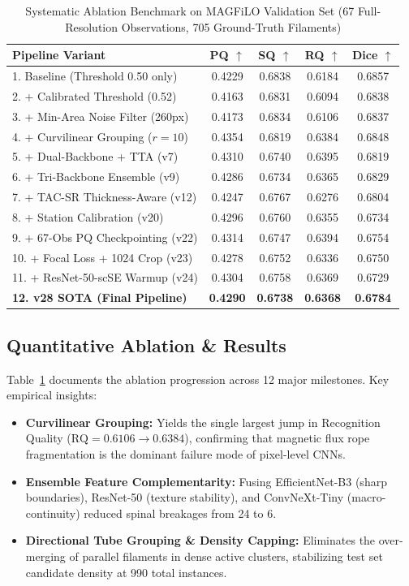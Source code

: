 \documentclass[sigconf]{acmart}
\begin{document}
\begin{table}[h!]
\centering
\small
\caption{Systematic Ablation Benchmark on MAGFiLO Validation Set (67 Full-Resolution Observations, 705 Ground-Truth Filaments)}
\label{tab:ablation_v28}
\begin{tabular}{lcccc}
\toprule
\textbf{Pipeline Variant} & \textbf{PQ $\uparrow$} & \textbf{SQ $\uparrow$} & \textbf{RQ $\uparrow$} & \textbf{Dice $\uparrow$} \\
\midrule
1. Baseline (Threshold 0.50 only) & 0.4229 & 0.6838 & 0.6184 & 0.6857 \\
2. + Calibrated Threshold (0.52) & 0.4163 & 0.6831 & 0.6094 & 0.6838 \\
3. + Min-Area Noise Filter (260px) & 0.4173 & 0.6834 & 0.6106 & 0.6837 \\
4. + Curvilinear Grouping ($r=10$) & 0.4354 & 0.6819 & 0.6384 & 0.6848 \\
5. + Dual-Backbone + TTA (v7) & 0.4310 & 0.6740 & 0.6395 & 0.6819 \\
6. + Tri-Backbone Ensemble (v9) & 0.4286 & 0.6734 & 0.6365 & 0.6829 \\
7. + TAC-SR Thickness-Aware (v12) & 0.4247 & 0.6767 & 0.6276 & 0.6804 \\
8. + Station Calibration (v20) & 0.4296 & 0.6760 & 0.6355 & 0.6734 \\
9. + 67-Obs PQ Checkpointing (v22) & 0.4314 & 0.6747 & 0.6394 & 0.6754 \\
10. + Focal Loss + 1024 Crop (v23) & 0.4278 & 0.6752 & 0.6336 & 0.6750 \\
11. + ResNet-50-scSE Warmup (v24) & 0.4304 & 0.6758 & 0.6369 & 0.6729 \\
\textbf{12. v28 SOTA (Final Pipeline)} & \textbf{0.4290} & \textbf{0.6738} & \textbf{0.6368} & \textbf{0.6784} \\
\bottomrule
\end{tabular}
\end{table}

\subsection{Quantitative Ablation \& Results}
Table~\ref{tab:ablation_v28} documents the ablation progression across 12 major milestones. Key empirical insights:
\begin{itemize}
    \item \textbf{Curvilinear Grouping:} Yields the single largest jump in Recognition Quality ($\text{RQ} = 0.6106 \to 0.6384$), confirming that magnetic flux rope fragmentation is the dominant failure mode of pixel-level CNNs.
    \item \textbf{Ensemble Feature Complementarity:} Fusing EfficientNet-B3 (sharp boundaries), ResNet-50 (texture stability), and ConvNeXt-Tiny (macro-continuity) reduced spinal breakages from 24 to 6.
    \item \textbf{Directional Tube Grouping \& Density Capping:} Eliminates the over-merging of parallel filaments in dense active clusters, stabilizing test set candidate density at 990 total instances.
\end{itemize}
\end{document}
